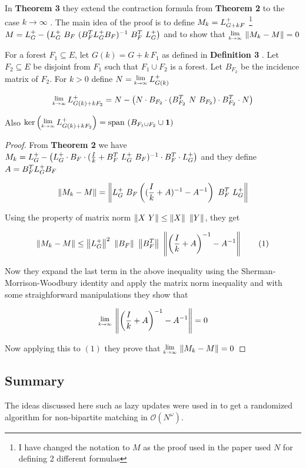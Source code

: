 In \textbf{Theorem 3} they extend the contraction formula from \textbf{Theorem 2} to the case $k \rightarrow \infty$ . The main idea of the proof is to define $M_k = \laplacian[G + kF]$ \footnote{I have changed the notation to $M$ as the proof used in the paper used $N$ for defining 2 different formulas} \\ $M = \laplacian - \left(\laplacian \ B_F \ (B_F^T \laplacian B_F)^{-1} \ B_F^T \  \laplacian\right)$ and to show that $\Lim{k \to \infty} \norm{M_k - M} = 0$

\begin{HXt}
 For a forest $F_1 \subseteq E$, let $G(k) = G + k \ F_1$ as defined in \textbf{Definition 3} . Let $F_2 \subseteq E$ be disjoint from $F_1$ such that $F_1 \cup F_2$ is a forest. Let $B_{F_2}$ be the incidence matrix of $F_2$. For $k > 0$ define $N = \Lim{k \to \infty} \laplacian[G(k)]$

 $$ \Lim{k \to \infty} \laplacian[G(k) + kF_2] = N - \left( N \cdot B_{F_2} \cdot (B_{F_2}^T \ N \ B_{F_2}) \cdot B_{F_2}^T \cdot N \right)$$ 

 Also $\text{ker} \left( \Lim{k \to \infty} \laplacian[G(k) + kF_2] \right) = \text{span }(B_{F_1 \cup F_2} \cup \textbf{1})$
 \end{HXt}



\begin{proof}
 From \textbf{Theorem 2} we have $M_k = \laplacian - \left(\laplacian \cdot B_F \cdot (\frac{I}{k} + B_F^T \ \laplacian \ B_F)^{-1} \cdot B_F^T \cdot \laplacian \right)$ and they define $A = B_F^T \laplacian B_F$
 
 $$ \norm{M_k - M} = \norm{\laplacian \ B_F \left( (\frac{I}{k} + A)^{-1} - A^{-1} \right) \ B_F^T \ \laplacian}$$
 
 Using the property of matrix norm $\norm{X \ Y} \leq \norm{X} \ \norm{Y}$, they get 
 
 $$ \norm{M_k - M} \leq \norm{\laplacian}^2 \ \norm{B_F} \ \norm{B_F^T} \ \norm{\left( \frac{I}{k} + A \right)^{-1} - A^{-1}} \qquad (1)$$
 
 Now they expand the last term in the above inequality using the Sherman-Morrison-Woodbury identity and apply the matrix norm inequality and with some straighforward manipulations they show that 
 
 $$\Lim{k \to \infty} \norm{\left( \frac{I}{k} + A \right)^{-1} - A^{-1} } = 0$$
 
Now applying this to $(1)$ they prove that $\Lim{k \to \infty} \norm{M_k - M} = 0$
\end{proof}



\subsection{Summary}

The ideas discussed here such as lazy updates were used in \citet{10.1137/070684008} to get a randomized algorithm for non-bipartite matching in $\mathcal{O}(N^\omega)$. 






